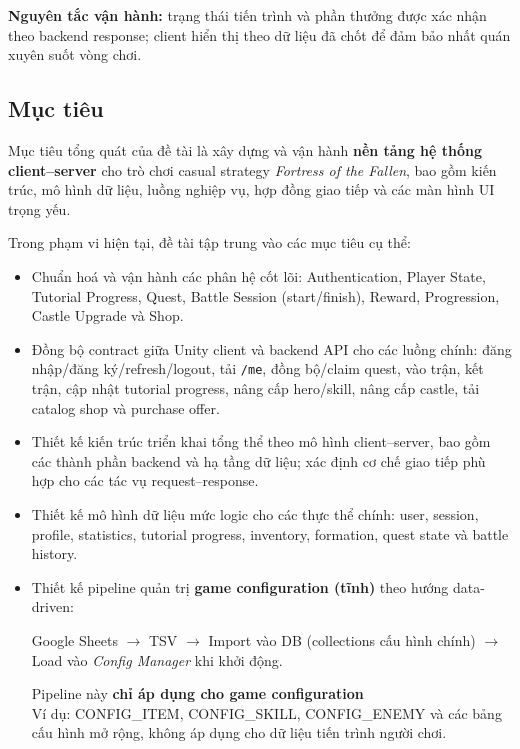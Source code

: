 \textbf{Nguyên tắc vận hành:} trạng thái tiến trình và phần thưởng được xác nhận theo backend response; client hiển thị theo dữ liệu đã chốt để đảm bảo nhất quán xuyên suốt vòng chơi.

\subsection{Mục tiêu}

Mục tiêu tổng quát của đề tài là xây dựng và vận hành \textbf{nền tảng hệ thống client--server} cho trò chơi casual strategy \textit{Fortress of the Fallen}, bao gồm kiến trúc, mô hình dữ liệu, luồng nghiệp vụ, hợp đồng giao tiếp và các màn hình UI trọng yếu.

Trong phạm vi hiện tại, đề tài tập trung vào các mục tiêu cụ thể:
\begin{itemize}
    \item Chuẩn hoá và vận hành các phân hệ cốt lõi: Authentication, Player State, Tutorial Progress, Quest, Battle Session (start/\allowbreak finish), Reward, Progression, Castle Upgrade và Shop.
    \item Đồng bộ contract giữa Unity client và backend API cho các luồng chính: đăng nhập/\allowbreak đăng ký/\allowbreak refresh/\allowbreak logout, tải \texttt{/me}, đồng bộ/\allowbreak claim quest, vào trận, kết trận, cập nhật tutorial progress, nâng cấp hero/\allowbreak skill, nâng cấp castle, tải catalog shop và purchase offer.
    \item Thiết kế kiến trúc triển khai tổng thể theo mô hình client--server, bao gồm các thành phần backend và hạ tầng dữ liệu; xác định cơ chế giao tiếp phù hợp cho các tác vụ request--response\cite{moriarty-networked,gregory-engine}.
    \item Thiết kế mô hình dữ liệu mức logic cho các thực thể chính: user, session, profile, statistics, tutorial progress, inventory, formation, quest state và battle history.
    \item Thiết kế pipeline quản trị \textbf{game configuration (tĩnh)} theo hướng data-driven:
    \begin{center}
        Google Sheets $\rightarrow$ TSV $\rightarrow$ Import vào DB (collections cấu hình chính) $\rightarrow$ Load vào \textit{Config Manager} khi khởi động.
    \end{center}
    Pipeline này \textbf{chỉ áp dụng cho game configuration} \\
    Ví dụ: CONFIG\_ITEM, CONFIG\_SKILL, CONFIG\_ENEMY và các bảng cấu hình mở rộng, không áp dụng cho dữ liệu tiến trình người chơi.
\end{itemize}

